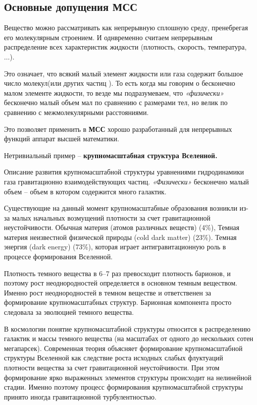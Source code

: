 \subsection{Основные допущения \textbf{МСС}}
Вещество можно рассматривать как непрерывную сплошную среду, пренебрегая его молекулярным строением. И однвременно считаем непрерывным распределение всех характеристик жидкости (плотность, скорость, температура, $\ldots$).

Это означает, что всякий малый элемент жидкости или газа содержит большое число молекул(или других частиц ). То есть когда мы говорим о бесконечно малом элементе жидкости, то везде мы подразумеваем,  что \emph{«физически»} бесконечно малый объем мал по сравнению с размерами тел, но велик по сравнению с межмолекулярными расстояниями.

Это позволяет применить в \textbf{МСС} хорошо разработанный для непрерывных функций аппарат высшей математики.

Нетривиальный пример – \textbf{крупномасштабная структура Вселенной.}

Описание развития крупномасштабной структуры  уравнениями гидродинамики газа гравитационно взаимодействующих частиц. \emph{«Физически»} бесконечно малый объем – объем в котором содержится много галактик.

Существующие на данный момент крупномасштабные образования возникли из-за малых начальных возмущений плотности за счет гравитационной неустойчивости. Обычная материя (атомов различных веществ) (4\%), Темная материя неизвестной физической природы (cold dark matter) (23\%). Темная энергия (dark energy) (73\%), которая играет антигравитационную роль в процессе формирования Вселенной.

Плотность темного вещества в 6–7 раз превосходит плотность барионов, и поэтому рост неоднородностей определяется в основном темным веществом. Именно рост неоднородностей в темном веществе и ответственен за формирование крупномасштабных структур. Барионная компонента просто следовала за эволюцией темного вещества.

В космологии понятие крупномасштабной структуры относится к распределению галактик и массы темного вещества (на масштабах от одного до нескольких сотен мегапарсек). Современная теория объясняет формирование крупномасштабной структуры Вселенной как следствие роста исходных слабых флуктуаций плотности вещества за счет гравитационной неустойчивости. При этом формирование ярко выраженных элементов структуры происходит на нелинейной стадии. Именно поэтому процесс формирования крупномасштабной структуры принято иногда гравитационной турбулентностью.

